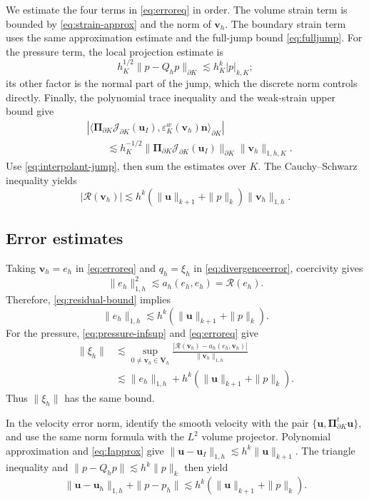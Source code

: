 \documentclass[review,hidelinks,onefignum,onetabnum]{siamart251216}
\begin{document}
We estimate the four terms in \eqref{eq:erroreq} in order.
The volume strain term is bounded by \eqref{eq:strain-approx} and the norm
of $\boldsymbol v_h$. The boundary strain term uses the same approximation
estimate and the full-jump bound \eqref{eq:fulljump}.
For the pressure term, the local projection estimate is
\[
h_K^{1/2}\|p-Q_hp\|_{\partial K}\lesssim h_K^k|p|_{k,K};
\]
its other factor is the normal part of the jump, which the discrete norm
controls directly. Finally, the polynomial trace inequality and the weak-strain
upper bound give
\[
\begin{aligned}
&|\langle\boldsymbol\Pi_{\partial K}\mathcal J_{\partial K}(\boldsymbol u_I),
\varepsilon_K^w(\boldsymbol v_h)\boldsymbol n\rangle_{\partial K}|\\
&\qquad\lesssim h_K^{-1/2}
\|\boldsymbol\Pi_{\partial K}\mathcal J_{\partial K}(\boldsymbol u_I)\|_{\partial K}
\|\boldsymbol v_h\|_{1,h,K}.
\end{aligned}
\]
Use \eqref{eq:interpolant-jump}, then sum the estimates over $K$.
The Cauchy--Schwarz inequality yields
\begin{equation}\label{eq:residual-bound}
|\mathcal R(\boldsymbol v_h)|\lesssim
h^k(\|\boldsymbol u\|_{k+1}+\|p\|_k)\|\boldsymbol v_h\|_{1,h}.
\end{equation}

\subsection{Error estimates}
Taking $\boldsymbol v_h=e_h$ in \eqref{eq:erroreq} and
$q_h=\xi_h$ in \eqref{eq:divergenceerror}, coercivity gives
\[
\|e_h\|_{1,h}^2\lesssim a_h(e_h,e_h)=\mathcal R(e_h).
\]
Therefore, \eqref{eq:residual-bound} implies
\[
\|e_h\|_{1,h}\lesssim h^k(\|\boldsymbol u\|_{k+1}+\|p\|_k).
\]
For the pressure, \eqref{eq:pressure-infsup} and \eqref{eq:erroreq} give
\[
\begin{aligned}
\|\xi_h\|&\lesssim\sup_{0\ne\boldsymbol v_h\in\boldsymbol V_h}
\frac{|\mathcal R(\boldsymbol v_h)-a_h(e_h,\boldsymbol v_h)|}{\|\boldsymbol v_h\|_{1,h}}\\
&\lesssim\|e_h\|_{1,h}+h^k(\|\boldsymbol u\|_{k+1}+\|p\|_k).
\end{aligned}
\]
Thus $\|\xi_h\|$ has the same bound.

In the velocity error norm, identify the smooth velocity with the pair
$\{\boldsymbol u,\boldsymbol\Pi_{\partial K}^t\boldsymbol u\}$, and use the same
norm formula with the $L^2$ volume projector.
Polynomial approximation and \eqref{eq:Iapprox} give
$\|\boldsymbol u-\boldsymbol u_I\|_{1,h}\lesssim h^k\|\boldsymbol u\|_{k+1}$.
The triangle inequality and $\|p-Q_hp\|\lesssim h^k\|p\|_k$ then yield
\begin{equation}\label{eq:final-error}
\|\boldsymbol u-\boldsymbol u_h\|_{1,h}+\|p-p_h\|
\lesssim h^k(\|\boldsymbol u\|_{k+1}+\|p\|_k).
\end{equation}
\end{document}
